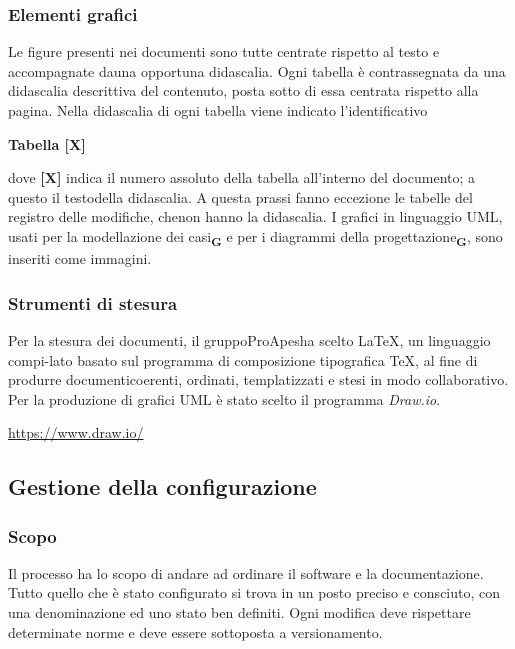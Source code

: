         \subsubsection{Elementi grafici}
            Le figure presenti nei documenti sono tutte centrate rispetto al testo e accompagnate dauna opportuna didascalia.
            Ogni tabella è contrassegnata da una didascalia descrittiva del contenuto, posta sotto di essa centrata rispetto alla pagina.  Nella didascalia di ogni tabella viene indicato l’identificativo
            \begin{center}
                \textbf{Tabella [X]}
            \end{center}
            dove \textbf{[X]} indica il numero assoluto della tabella all’interno del documento; a questo il testodella didascalia. A questa prassi fanno eccezione le tabelle del registro delle modifiche, chenon hanno la didascalia.
            I grafici in linguaggio UML, usati per la modellazione dei casi\textsubscript{\textbf{G}} e per i diagrammi della progettazione\textsubscript{\textbf{G}}, sono inseriti come immagini.
        \subsubsection{Strumenti di stesura}
            \subsubsubsection{\LaTeX}
            Per la stesura dei documenti, il gruppoProApesha scelto \LaTeX, un linguaggio compi-lato basato sul programma di composizione tipografica \TeX, al fine di produrre documenticoerenti, ordinati, templatizzati e stesi in modo collaborativo.
            Per la produzione di grafici UML è stato scelto il programma \textit{Draw.io}.
            \begin{center}
                \href{https://www.draw.io/}{https://www.draw.io/}\\
            \end{center}
    \subsection{Gestione della configurazione}
        \subsubsection{Scopo}
        Il processo ha lo scopo di andare ad ordinare il software e la documentazione. Tutto quello che è stato configurato si trova in un posto preciso e consciuto, con una denominazione ed uno stato ben definiti. Ogni modifica deve rispettare determinate norme e deve essere sottoposta a versionamento.
